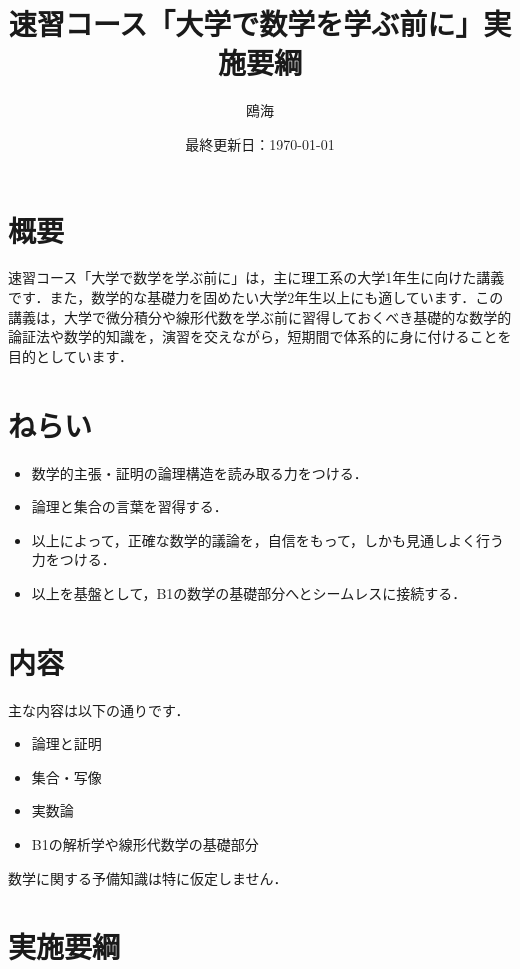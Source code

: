 \documentclass[lualatex, ja=standard, b5j, base=9pt, label-section=none]{bxjsarticle}
\title{\sf 速習コース「大学で数学を学ぶ前に」実施要綱}
\author{鴎海}
\date{\normalsize 最終更新日：\today}
\begin{document}
\maketitle


\begin{multicols*}{2}

  \section{概要}

  速習コース「大学で数学を学ぶ前に」は，主に理工系の大学1年生に向けた講義です．また，数学的な基礎力を固めたい大学2年生以上にも適しています．この講義は，大学で微分積分や線形代数を学ぶ前に習得しておくべき基礎的な数学的論証法や数学的知識を，演習を交えながら，短期間で体系的に身に付けることを目的としています．


  \section{ねらい}

  \begin{itemize}
    \item 数学的主張・証明の論理構造を読み取る力をつける．
    \item 論理と集合の言葉を習得する．
    \item 以上によって，正確な数学的議論を，自信をもって，しかも見通しよく行う力をつける．
    \item 以上を基盤として，B1の数学の基礎部分へとシームレスに接続する．
  \end{itemize}


  \section{内容}

  主な内容は以下の通りです．
  \begin{itemize}
    \item 論理と証明
    \item 集合・写像
    \item 実数論
    \item B1の解析学や線形代数学の基礎部分
  \end{itemize}

  数学に関する予備知識は特に仮定しません．


  \section{実施要綱}


\end{multicols*}
\end{document}

